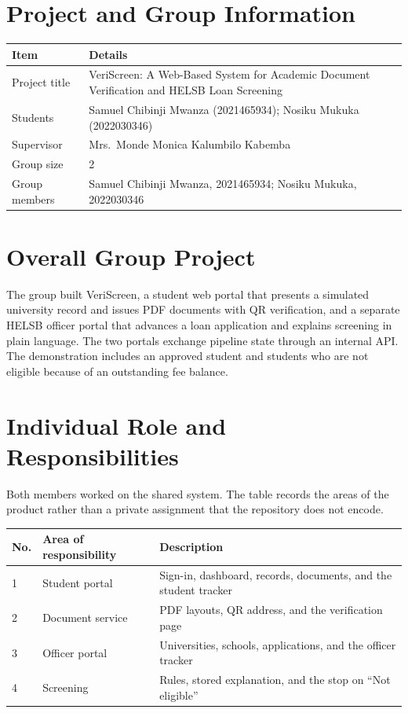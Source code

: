 \documentclass[12pt,a4paper]{report}
\begin{document}
\section{Project and Group Information}

\begin{table}[H]
\centering
\begin{tabular}{p{}p{}}
\toprule
\textbf{Item} & \textbf{Details} \\
\midrule
Project title & VeriScreen: A Web-Based System for Academic Document Verification and HELSB Loan Screening \\
Students & Samuel Chibinji Mwanza (2021465934); Nosiku Mukuka (2022030346) \\
Supervisor & Mrs.\ Monde Monica Kalumbilo Kabemba \\
Group size & 2 \\
Group members & Samuel Chibinji Mwanza, 2021465934; Nosiku Mukuka, 2022030346 \\
\bottomrule
\end{tabular}
\end{table}

\section{Overall Group Project}
The group built VeriScreen, a student web portal that presents a simulated university record and issues PDF documents with QR verification, and a separate HELSB officer portal that advances a loan application and explains screening in plain language. The two portals exchange pipeline state through an internal API. The demonstration includes an approved student and students who are not eligible because of an outstanding fee balance.

\section{Individual Role and Responsibilities}
Both members worked on the shared system. The table records the areas of the product rather than a private assignment that the repository does not encode.

\begin{table}[H]
\centering
\begin{tabular}{p{}p{}p{}}
\toprule
\textbf{No.} & \textbf{Area of responsibility} & \textbf{Description} \\
\midrule
1 & Student portal & Sign-in, dashboard, records, documents, and the student tracker \\
2 & Document service & PDF layouts, QR address, and the verification page \\
3 & Officer portal & Universities, schools, applications, and the officer tracker \\
4 & Screening & Rules, stored explanation, and the stop on ``Not eligible'' \\
\bottomrule
\end{tabular}
\end{table}
\end{document}
